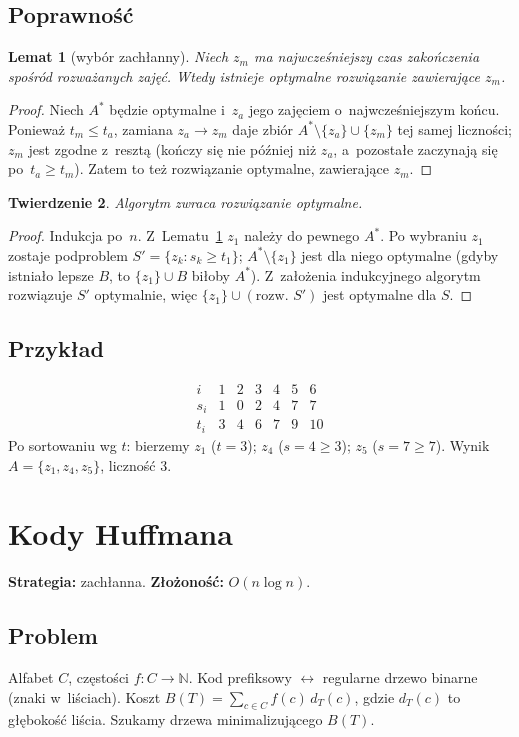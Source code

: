 \documentclass[11pt,a4paper]{article}
\theoremstyle{plain}
\newtheorem{twierdzenie}{Twierdzenie}[section]
\newtheorem{lemat}[twierdzenie]{Lemat}
\theoremstyle{definition}
\newcommand{\N}{\mathbb{N}}
\begin{document}
\subsection*{Poprawność}
\begin{lemat}[wybór zachłanny]\label{lem:act}
Niech $z_m$ ma najwcześniejszy czas zakończenia spośród rozważanych zajęć. Wtedy istnieje optymalne
rozwiązanie zawierające $z_m$.
\end{lemat}
\begin{proof}
Niech $A^\ast$ będzie optymalne i~$z_a$ jego zajęciem o~najwcześniejszym końcu. Ponieważ $t_m\le t_a$,
zamiana $z_a\to z_m$ daje zbiór $A^\ast\setminus\{z_a\}\cup\{z_m\}$ tej samej liczności; $z_m$ jest zgodne
z~resztą (kończy się nie później niż $z_a$, a~pozostałe zaczynają się po~$t_a\ge t_m$). Zatem to też
rozwiązanie optymalne, zawierające $z_m$.
\end{proof}
\begin{twierdzenie}
Algorytm zwraca rozwiązanie optymalne.
\end{twierdzenie}
\begin{proof}
Indukcja po~$n$. Z~Lematu~\ref{lem:act} $z_1$ należy do pewnego $A^\ast$. Po wybraniu $z_1$ zostaje
podproblem $S'=\{z_k:s_k\ge t_1\}$; $A^\ast\setminus\{z_1\}$ jest dla niego optymalne (gdyby istniało
lepsze $B$, to $\{z_1\}\cup B$ biłoby $A^\ast$). Z~założenia indukcyjnego algorytm rozwiązuje $S'$
optymalnie, więc $\{z_1\}\cup(\text{rozw. }S')$ jest optymalne dla $S$.
\end{proof}

\subsection*{Przykład}
\[
\begin{array}{c|cccccc}
i & 1&2&3&4&5&6\\\hline
s_i & 1&0&2&4&7&7\\
t_i & 3&4&6&7&9&10
\end{array}
\]
Po sortowaniu wg $t$: bierzemy $z_1$ ($t=3$); $z_4$ ($s=4\ge3$); $z_5$ ($s=7\ge7$). Wynik
$A=\{z_1,z_4,z_5\}$, liczność $3$.

\section{Kody Huffmana}\label{sec:huffman}
\textbf{Strategia:} zachłanna. \quad\textbf{Złożoność:} $O(n\log n)$.

\subsection*{Problem}
Alfabet $C$, częstości $f:C\to\N$. Kod prefiksowy $\leftrightarrow$ regularne drzewo binarne (znaki w~liściach).
Koszt $B(T)=\sum_{c\in C} f(c)\,d_T(c)$, gdzie $d_T(c)$ to głębokość liścia. Szukamy drzewa minimalizującego $B(T)$.
\end{document}
